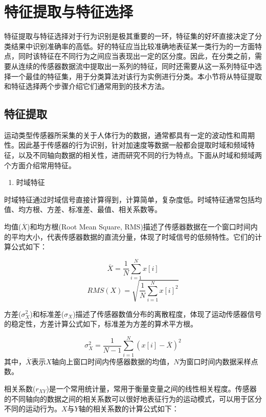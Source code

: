 \section{特征提取与特征选择}
\par 特征提取与特征选择对于行为识别是极其重要的一环，特征集的好坏直接决定了分类结果中识别准确率的高低。好的特征应当比较准确地表征某一类行为的一方面特点，同时该特征在不同行为之间应当表现出一定的区分度。因此，在分类之前，需要从连续的传感器数据流中提取出一系列的特征，同时还需要从这一系列特征中选择一个最佳的特征集，用于分类算法对该行为实例进行分类。本小节将从特征提取和特征选择两个步骤介绍它们通常用到的技术方法。

\subsection{特征提取}
\par 运动类型传感器所采集的关于人体行为的数据，通常都具有一定的波动性和周期性。因此基于传感器的行为识别，针对加速度等数据一般都会提取时域和频域特征，以及不同轴向数据的相关性，进而研究不同的行为特点。下面从时域和频域两个方面介绍常用特征。

\begin{enumerate}[(1)]
	\item 时域特征
\end{enumerate}
\par 时域特征通过时域信号直接计算得到，计算简单，复杂度低。时域特征通常包括均值、均方根、方差、标准差、最值、相关系数等。

\par 均值($\overline{X}$)和均方根(Root Mean Square, RMS)描述了传感器数据在一个窗口时间内的平均大小，代表传感器数据的直流分量，体现了时域信号的低频特性。它们的计算公式如下：

\begin{equation}
	\overline{X} = \frac{1}{N}\sum_{i=1}^{N}x[i]
\end{equation}
\begin{equation}
	RMS(X) = \sqrt{\frac{1}{N}\sum_{i=1}^{N}x[i]^2}
\end{equation}
\par 方差($\sigma_X^2$)和标准差($\sigma_X$)描述了传感器数值分布的离散程度，体现了运动传感器信号的稳定性，方差计算公式如下，标准差为方差的算术平方根。

\begin{equation}
	\sigma_X^2 = \frac{1}{N-1}\sum_{i=1}^{N}(x[i]-\overline{X})^2
\end{equation}
其中，$\overline{X}$表示$X$轴向上窗口时间内传感器数据的均值，$N$为窗口时间内数据采样点数。
\par 相关系数($r_{XY}$)是一个常用统计量，常用于衡量变量之间的线性相关程度。传感器的不同轴向的数据之间的相关系数可以很好地表征行为的运动模式，可以用于区分不同的运动行为。$X$与$Y$轴的相关系数的计算公式如下：

